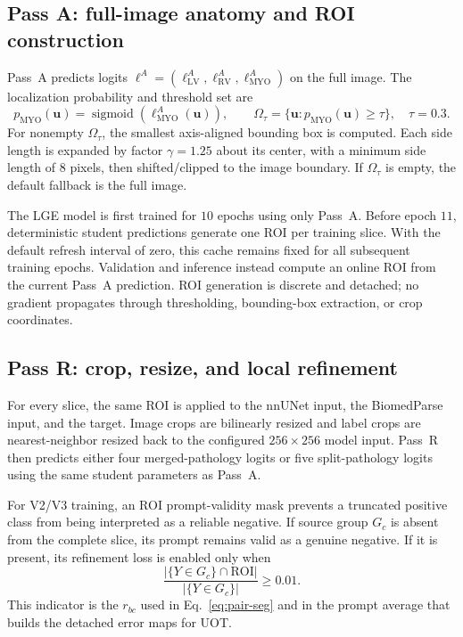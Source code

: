 \documentclass[10pt]{article}
\newcommand{\sigm}{\operatorname{sigmoid}}
\begin{document}
\subsection{Pass A: full-image anatomy and ROI construction}

Pass~A predicts logits
$\bm{\ell}^{A}=(\ell^{A}_{\mathrm{LV}},\ell^{A}_{\mathrm{RV}},
\ell^{A}_{\mathrm{MYO}})$ on the full image.  The localization probability and
threshold set are
\begin{equation}
    p_{\mathrm{MYO}}(\bm{u})=\sigm(\ell^{A}_{\mathrm{MYO}}(\bm{u})),
    \qquad
    \Omega_{\tau}=\{\bm{u}:p_{\mathrm{MYO}}(\bm{u})\geq\tau\},
    \quad \tau=0.3.
    \label{eq:roi-mask}
\end{equation}
For nonempty $\Omega_\tau$, the smallest axis-aligned bounding box is computed.
Each side length is expanded by factor $\gamma=1.25$ about its center, with a
minimum side length of $8$ pixels, then shifted/clipped to the image boundary.
If $\Omega_\tau$ is empty, the default fallback is the full image.

The LGE model is first trained for $10$ epochs using only Pass~A.  Before epoch
$11$, deterministic student predictions generate one ROI per training slice.
With the default refresh interval of zero, this cache remains fixed for all
subsequent training epochs.  Validation and inference instead compute an online
ROI from the current Pass~A prediction.  ROI generation is discrete and detached;
no gradient propagates through thresholding, bounding-box extraction, or crop
coordinates.

\subsection{Pass R: crop, resize, and local refinement}

For every slice, the same ROI is applied to the nnUNet input, the BiomedParse
input, and the target.  Image crops are bilinearly resized and label crops are
nearest-neighbor resized back to the configured $256\times256$ model input.
Pass~R then predicts either four merged-pathology logits or five split-pathology
logits using the same student parameters as Pass~A.

For V2/V3 training, an ROI prompt-validity mask prevents a truncated positive
class from being interpreted as a reliable negative.  If source group $G_c$ is
absent from the complete slice, its prompt remains valid as a genuine negative.
If it is present, its refinement loss is enabled only when
\begin{equation}
    \frac{|\{Y\in G_c\}\cap\mathrm{ROI}|}
         {|\{Y\in G_c\}|}\geq0.01.
    \label{eq:roi-visibility}
\end{equation}
This indicator is the $r_{bc}$ used in Eq.~\eqref{eq:pair-seg} and in the
prompt average that builds the detached error maps for UOT.
\end{document}
